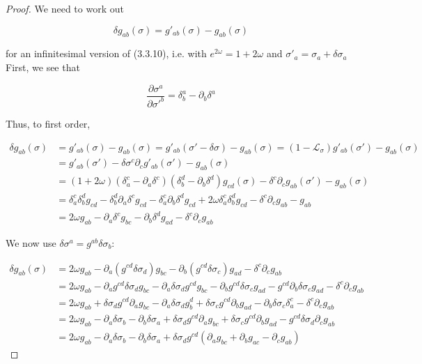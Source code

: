 \begin{tcolorbox}[breakable]
	\begin{proof}
		We need to work out
		
		\[
		\delta g_{ab}(\sigma) = g'_{ab}(\sigma) - g_{ab}(\sigma) 
		\]
		
		for an infinitesimal version of (3.3.10), i.e. with \( e^{2\omega} = 1 + 2\omega \) and \(\sigma'_a = \sigma_a + \delta\sigma_a\) First, we see that
		
		\[
		\frac{\partial \sigma^a}{\partial \sigma'^b} = \delta^a_b - \partial_b \delta^a 
		\]
		
		Thus, to first order,
		
		\[
		\begin{aligned}
			\delta g_{ab}(\sigma) &= g'_{ab}(\sigma) - g_{ab}(\sigma) = g'_{ab}(\sigma' - \delta\sigma) - g_{ab}(\sigma) =(1-\mathcal{L}_{\sigma})g'_{ab}(\sigma')-g_{ab}(\sigma)\\
			&= g'_{ab}(\sigma') - \delta\sigma^c \partial_c g'_{ab}(\sigma') - g_{ab}(\sigma) \\
			&= (1 + 2\omega)(\delta^c_a - \partial_a \delta^c) (\delta^d_b - \partial_b \delta^d)g_{cd}(\sigma) - \delta^c \partial_c g_{ab}(\sigma') - g_{ab}(\sigma) \\
			&= \delta^c_a \delta^d_b g_{cd} - \delta^d_b \partial_a \delta^c g_{cd} - \delta^c_a \partial_b \delta^d g_{cd} + 2\omega \delta^c_a \delta^d_b g_{cd} - \delta^c \partial_c g_{ab} - g_{ab} \\
			&= 2\omega g_{ab} - \partial_a \delta^c g_{bc} - \partial_b \delta^d g_{ad} - \delta^c \partial_c g_{ab} 
		\end{aligned}
		\]
		
		We now use \(\delta \sigma^a = g^{ab} \delta \sigma_b\):
		
		\[
		\begin{aligned}
			\delta g_{ab}(\sigma) &= 2\omega g_{ab} - \partial_a (g^{cd} \delta \sigma_d) g_{bc} - \partial_b (g^{cd} \delta \sigma_c) g_{ad} - \delta^c \partial_c g_{ab} \\
			&= 2\omega g_{ab} - \partial_a g^{cd} \delta \sigma_d g_{bc} - \partial_a \delta \sigma_d g^{cd} g_{bc} - \partial_b g^{cd} \delta \sigma_c g_{ad} - g^{cd} \partial_b \delta \sigma_c g_{ad} - \delta^c \partial_c g_{ab} \\
			&= 2\omega g_{ab} + \delta \sigma_d g^{cd} \partial_a g_{bc} - \partial_a \delta \sigma_d g^d_b + \delta \sigma_c g^{cd} \partial_b g_{ad} - \partial_b \delta \sigma_c \delta^c_a - \delta^c \partial_c g_{ab} \\
			&= 2\omega g_{ab} - \partial_a \delta \sigma_b - \partial_b \delta \sigma_a + \delta \sigma_d g^{cd} \partial_a g_{bc} + \delta \sigma_c g^{cd} \partial_b g_{ad} - g^{cd} \delta \sigma_d \partial_c g_{ab} \\
			&= 2\omega g_{ab} - \partial_a \delta \sigma_b - \partial_b \delta \sigma_a + \delta \sigma_d g^{cd} (\partial_a g_{bc} + \partial_b g_{ac} - \partial_c g_{ab}) 
		\end{aligned}
		\]
		

\end{proof}
\end{tcolorbox}
